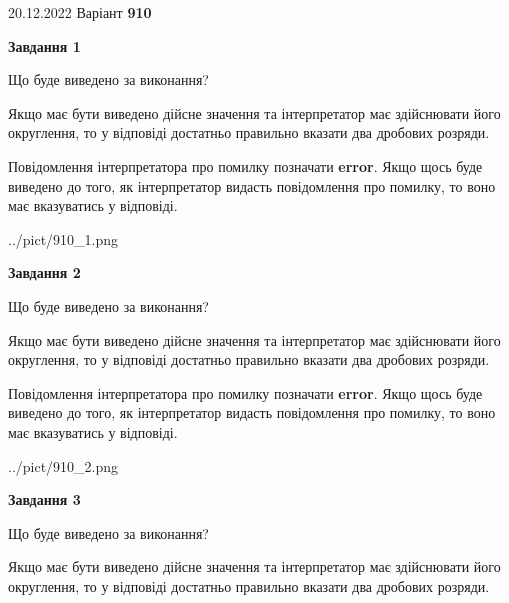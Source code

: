 \documentclass[12pt, ukrainian]{article}
\begin{document}
{20.12.2022 Варіант \No \textbf { 910 }\par}
{
\begin {Large}

{\begin {center}\textbf{Завдання 1}\end {center}}\par
Що буде виведено за виконання? \par

Якщо має бути виведено дійсне значення та інтерпретатор має здійснювати його округлення, 
то у відповіді достатньо правильно вказати два дробових розряди.

Повідомлення інтерпретатора про помилку позначати \textbf{error}.
Якщо щось буде виведено до того, як інтерпретатор видасть повідомлення про помилку, 
то воно має вказуватись у відповіді. \par

\begin{center}
	{../pict/910_1.png}
\end{center}
\newpage

{\begin {center}\textbf{Завдання 2}\end {center}}\par
Що буде виведено за виконання? \par

Якщо має бути виведено дійсне значення та інтерпретатор має здійснювати його округлення, 
то у відповіді достатньо правильно вказати два дробових розряди.

Повідомлення інтерпретатора про помилку позначати \textbf{error}.
Якщо щось буде виведено до того, як інтерпретатор видасть повідомлення про помилку, 
то воно має вказуватись у відповіді. \par

\begin{center}
	{../pict/910_2.png}
\end{center}
\newpage

{\begin {center}\textbf{Завдання 3}\end {center}}\par
Що буде виведено за виконання? \par

Якщо має бути виведено дійсне значення та інтерпретатор має здійснювати його округлення, 
то у відповіді достатньо правильно вказати два дробових розряди.


\end{Large}}
\end{document}
